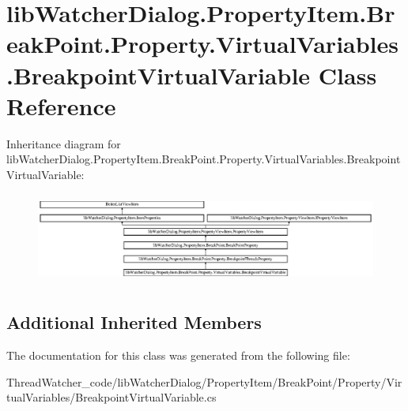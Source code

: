 \hypertarget{classlib_watcher_dialog_1_1_property_item_1_1_break_point_1_1_property_1_1_virtual_variables_1_1_breakpoint_virtual_variable}{\section{lib\+Watcher\+Dialog.\+Property\+Item.\+Break\+Point.\+Property.\+Virtual\+Variables.\+Breakpoint\+Virtual\+Variable Class Reference}
\label{classlib_watcher_dialog_1_1_property_item_1_1_break_point_1_1_property_1_1_virtual_variables_1_1_breakpoint_virtual_variable}
}
Inheritance diagram for lib\+Watcher\+Dialog.\+Property\+Item.\+Break\+Point.\+Property.\+Virtual\+Variables.\+Breakpoint\+Virtual\+Variable\+:\begin{figure}[H]
\begin{center}
\leavevmode
\includegraphics[height=3.037975cm]{classlib_watcher_dialog_1_1_property_item_1_1_break_point_1_1_property_1_1_virtual_variables_1_1_breakpoint_virtual_variable}
\end{center}
\end{figure}
\subsection*{Additional Inherited Members}


The documentation for this class was generated from the following file\+:\begin{DoxyCompactItemize}
\item 
Thread\+Watcher\+\_\+code/lib\+Watcher\+Dialog/\+Property\+Item/\+Break\+Point/\+Property/\+Virtual\+Variables/Breakpoint\+Virtual\+Variable.\+cs\end{DoxyCompactItemize}
